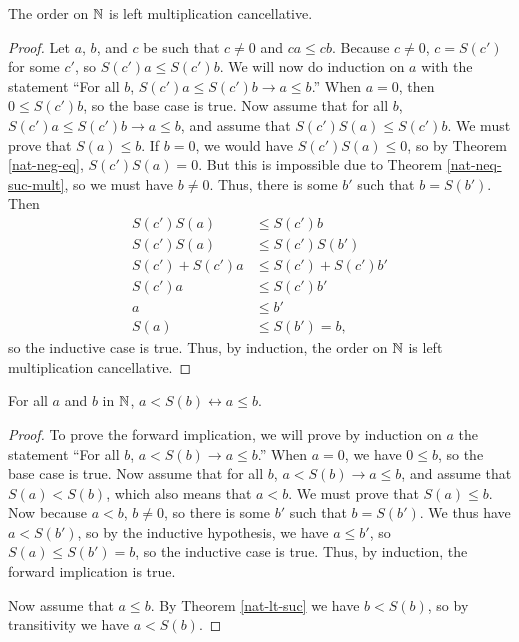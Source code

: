 \documentclass[../math.tex]{subfiles}
\begin{document}
\begin{instance}
    The order on $\mathbb{N}$ is left multiplication cancellative.
\end{instance}
\begin{proof}
    Let $a$, $b$, and $c$ be such that $c \neq 0$ and $ca \leq cb$.  Because $c
    \neq 0$, $c = S(c')$ for some $c'$, so $S(c')a \leq S(c')b$.  We will now do
    induction on $a$ with the statement ``For all $b$, $S(c')a \leq S(c')b
    \rightarrow a \leq b$.''  When $a = 0$, then $0 \leq S(c')b$, so the base
    case is true.  Now assume that for all $b$, $S(c')a \leq S(c')b \rightarrow
    a \leq b$, and assume that $S(c')S(a) \leq S(c')b$.  We must prove that
    $S(a) \leq b$.  If $b = 0$, we would have $S(c')S(a) \leq 0$, so by Theorem
    \ref{nat-neg-eq}, $S(c')S(a) = 0$.  But this is impossible due to Theorem
    \ref{nat-neq-suc-mult}, so we must have $b \neq 0$.  Thus, there is some
    $b'$ such that $b = S(b')$.  Then
    \begin{align*}
        S(c')S(a) &\leq S(c')b \\
        S(c')S(a) &\leq S(c')S(b') \\
        S(c') + S(c')a &\leq S(c') + S(c')b' \\
        S(c')a &\leq S(c')b' \\
        a &\leq b' \\
        S(a) &\leq S(b') = b,
    \end{align*}
    so the inductive case is true.  Thus, by induction, the order on $\mathbb{N}$ is
    left multiplication cancellative.
\end{proof}

\begin{theorem} \label{nat-lt-suc-le}
    For all $a$ and $b$ in $\mathbb{N}$, $a < S(b) \leftrightarrow a \leq b$.
\end{theorem}
\begin{proof}
    To prove the forward implication, we will prove by induction on $a$ the
    statement ``For all $b$, $a < S(b) \rightarrow a \leq b$.''  When $a = 0$,
    we have $0 \leq b$, so the base case is true.  Now assume that for all $b$,
    $a < S(b) \rightarrow a \leq b$, and assume that $S(a) < S(b)$, which also
    means that $a < b$.  We must prove that $S(a) \leq b$.  Now because $a < b$,
    $b \neq 0$, so there is some $b'$ such that $b = S(b')$.  We thus have $a <
    S(b')$, so by the inductive hypothesis, we have $a \leq b'$, so $S(a) \leq
    S(b') = b$, so the inductive case is true.  Thus, by induction, the forward
    implication is true.

    Now assume that $a \leq b$.  By Theorem \ref{nat-lt-suc} we have $b < S(b)$,
    so by transitivity we have $a < S(b)$.
\end{proof}
\end{document}
